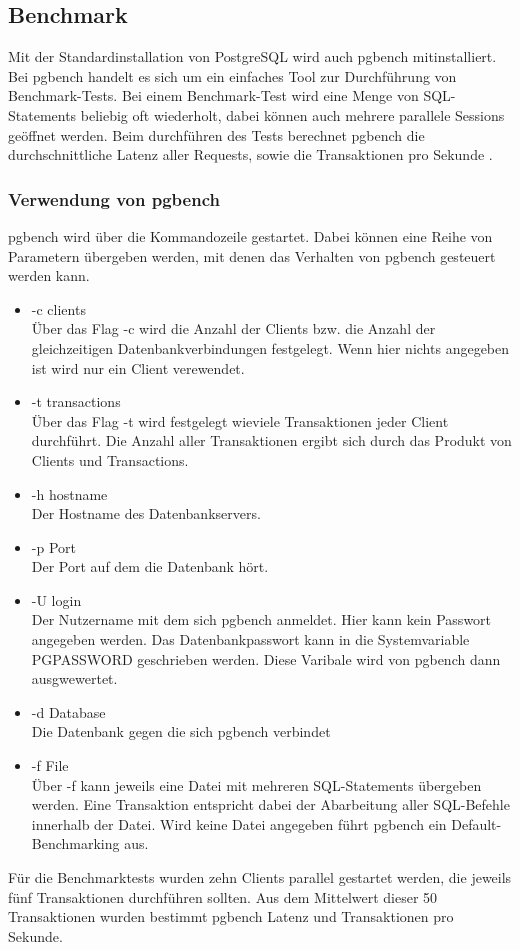 \subsection{Benchmark}
Mit der Standardinstallation von PostgreSQL wird auch pgbench mitinstalliert. Bei pgbench handelt es sich um ein einfaches Tool zur Durchführung von Benchmark-Tests. Bei einem Benchmark-Test wird eine Menge von \ac{SQL}-Statements beliebig oft wiederholt, dabei können auch mehrere parallele Sessions geöffnet werden. Beim durchführen des Tests berechnet pgbench die durchschnittliche Latenz aller Requests, sowie die Transaktionen pro Sekunde \cite{postgres2018}.
\subsubsection{Verwendung von pgbench}
pgbench wird über die Kommandozeile gestartet. Dabei können eine Reihe von Parametern übergeben werden, mit denen das Verhalten von pgbench gesteuert werden kann.
\begin{itemize}
	\item -c clients  \\
	Über das Flag -c wird die Anzahl der Clients bzw. die Anzahl der gleichzeitigen Datenbankverbindungen festgelegt. Wenn hier nichts angegeben ist wird nur ein Client verewendet.
	\item -t transactions \\
	Über das Flag -t wird festgelegt wieviele Transaktionen jeder Client durchführt. Die Anzahl aller Transaktionen ergibt sich durch das Produkt von Clients und Transactions.
	\item -h hostname \\
	Der Hostname des Datenbankservers.
	\item -p Port \\
	Der Port auf dem die Datenbank hört.
	\item -U login \\
	Der Nutzername mit dem sich pgbench anmeldet. Hier kann kein Passwort angegeben werden. Das Datenbankpasswort kann in die Systemvariable PGPASSWORD geschrieben werden. Diese Varibale wird von pgbench dann ausgwewertet.
	\item -d Database \\
	Die Datenbank gegen die sich pgbench verbindet
	\item -f File \\ 
	Über -f kann jeweils eine Datei mit mehreren SQL-Statements übergeben werden. Eine Transaktion entspricht dabei der Abarbeitung aller SQL-Befehle innerhalb der Datei.
	Wird keine Datei angegeben führt pgbench ein Default-Benchmarking aus.

\end{itemize}
Für die Benchmarktests wurden zehn Clients parallel gestartet werden, die jeweils fünf Transaktionen durchführen sollten. Aus dem Mittelwert dieser 50 Transaktionen wurden bestimmt pgbench Latenz und Transaktionen pro Sekunde.

